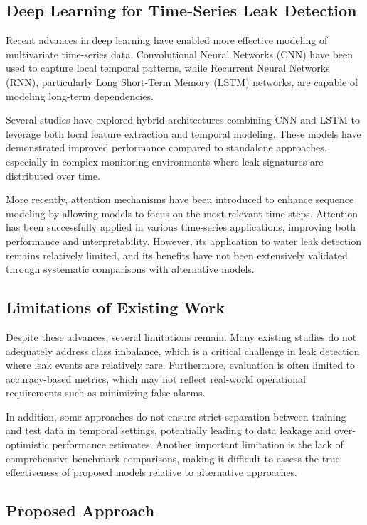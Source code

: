 \subsection{Deep Learning for Time-Series Leak Detection}

Recent advances in deep learning have enabled more effective modeling of
multivariate time-series data. Convolutional Neural Networks (CNN) have been
used to capture local temporal patterns, while Recurrent Neural Networks (RNN),
particularly Long Short-Term Memory (LSTM) networks, are capable of modeling
long-term dependencies.

Several studies have explored hybrid architectures combining CNN and LSTM
to leverage both local feature extraction and temporal modeling. These models
have demonstrated improved performance compared to standalone approaches,
especially in complex monitoring environments where leak signatures are
distributed over time.

More recently, attention mechanisms have been introduced to enhance sequence
modeling by allowing models to focus on the most relevant time steps. Attention
has been successfully applied in various time-series applications, improving both
performance and interpretability. However, its application to water leak
detection remains relatively limited, and its benefits have not been extensively
validated through systematic comparisons with alternative models.

\subsection{Limitations of Existing Work}

Despite these advances, several limitations remain. Many existing studies do not
adequately address class imbalance, which is a critical challenge in leak
detection where leak events are relatively rare. Furthermore, evaluation is often
limited to accuracy-based metrics, which may not reflect real-world operational
requirements such as minimizing false alarms.

In addition, some approaches do not ensure strict separation between training and
test data in temporal settings, potentially leading to data leakage and
over-optimistic performance estimates. Another important limitation is the lack
of comprehensive benchmark comparisons, making it difficult to assess the true
effectiveness of proposed models relative to alternative approaches.

\subsection{Proposed Approach}

